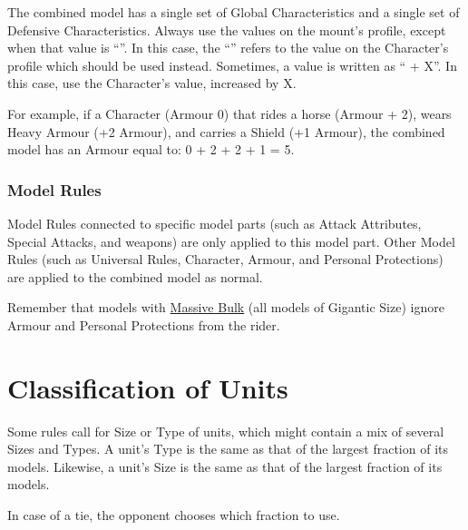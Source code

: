 The combined model has a single set of Global Characteristics and a single set of Defensive Characteristics. Always use the values on the mount's profile, except when that value is \enquote{\ascharacter}. In this case, the \enquote{\ascharacter} refers to the value on the Character's profile which should be used instead. Sometimes, a value is written as \enquote{\ascharacter{} + X}. In this case, use the Character's value, increased by X.

For example, if a Character (Armour 0) that rides a horse (Armour \ascharacter{} + 2), wears Heavy Armour (+2 Armour), and carries a Shield (+1 Armour), the combined model has an Armour equal to: 0 + 2 + 2 + 1 = 5.

\subsubsection{Model Rules}

Model Rules connected to specific model parts (such as Attack Attributes, Special Attacks, and weapons) are only applied to this model part. Other Model Rules (such as Universal Rules, Character, Armour, and Personal Protections) are applied to the combined model as normal. 

Remember that models with \hyperref[massive_bulk]{Massive Bulk} (all models of Gigantic Size) ignore Armour and Personal Protections from the rider.

\section{Classification of Units}

Some rules call for Size or Type of units, which might contain a mix of several Sizes and Types. A unit's Type is the same as that of the largest fraction of its models. Likewise, a unit's Size is the same as that of the largest fraction of its models.

In case of a tie, the opponent chooses which fraction to use.
